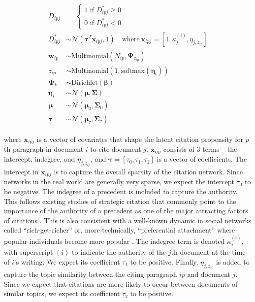 \begin{align}
  \begin{split}
	D_{ipj} &= \begin{cases}
		1 \text{ if } D_{ipj}^* \geq 0 \\
		0 \text { if } D_{ipj}^* < 0
	\end{cases}\\
    D_{ipj}^* &\sim \mathcal{N}(\pmb\tau^T\textbf{x}_{ipj},1)\quad \text{where}\ \textbf{x}_{ipj} = [1, \kappa_{j}^{(i)}, \eta_{j,z_{ip}}]\\
	\textbf{w}_{ip} &\sim \text{Multinomial}(N_{ip},\pmb\Psi_{z_{ip}})  \\
	z_{ip} &\sim \text{Multinomial}(1,\text{softmax}(\pmb\eta_i))  \\
	\pmb\Psi_k &\sim \text{Dirichlet}(\pmb\beta)  \\
	\pmb\eta_i &\sim \mathcal{N}(\pmb\mu,\pmb\Sigma)  \\
	\pmb\mu &\sim \mathcal{N}(\pmb\mu_0, \pmb\Sigma_0)  \\
	\pmb\tau &\sim \mathcal{N}(\pmb\mu_{\tau},\pmb\Sigma_{\tau})
  \end{split}
\end{align}

\noindent where $\mathbf{x}_{ipj}$ is a vector of covariates that shape the latent citation propensity for $p$th paragraph in document $i$ to cite document $j$. $\mathbf{x}_{ipj}$ consists of 3 terms -- the intercept, indegree, and $\eta_{j,z_{ip}}$, and $\pmb\tau = [\tau_0, \tau_1, \tau_2]$ is a vector of coefficients.
The intercept in $\textbf{x}_{ipj}$ is to capture the overall sparsity of the citation network. Since networks in the real world are generally very sparse, we expect the intercept $\tau_0$ to be negative. 
The indegree of a precedent is included to capture the authority. 
This follows existing studies of strategic citation that commonly point to the importance of the authority of a precedent as one of the major attracting factors of citations  \citep{hansford2006politics,lupu2012precedent, lupu2013strategic}. 
This is also consistent with a well-known dynamic in social networks called ``rich-get-richer'' or, more technically, ``preferential attachment'' where popular individuals become more popular \citep{newman2001clustering,wang2008measuring}. 
The indegree term is denoted $\kappa_j^{(i)}$, with superscript $(i)$ to indicate the authority of the $j$th document at the time of $i$'s writing. We expect its coefficient $\tau_1$ to be positive. 
Finally, $\eta_{j,z_{ip}}$ is added to capture the topic similarity between the citing paragraph $ip$ and document $j$. 
Since we expect that citations are more likely to occur between documents of similar topics, we expect its coefficient $\tau_2$ to be positive. 
 

